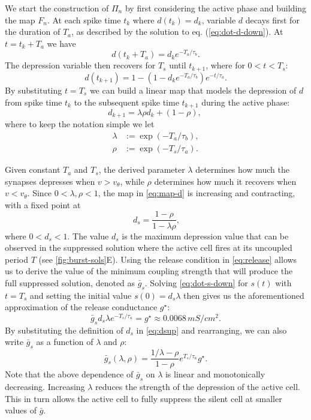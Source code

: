 We start the construction of $\Pi_n$ by first considering the active phase and building the map $F_n$.
At each spike time $t_{k}$ where $d(t_k) = d_k$, variable $d$ decays first for the duration of $T_{a}$, as described by the solution to eq. (\ref{eq:dot-d-down}).  %
At $t = t_k + T_{a}$ we have
\begin{equation}
	d(t_k + T_{a}) = d_k e^{-T_{a}/\tau_b}.
\end{equation}
The depression variable then recovers for $T_{s}$ until $t_{k+1}$, where for $0<t<T_{s}$:
\begin{equation}
	d(t_{k+1}) = 1 - (1 - d_k e^{-T_{a}/\tau_b} )e^{-t/\tau_a}.
\end{equation}
By substituting $t=T_{s}$ we can build a linear map that models the depression of $d$ from spike time $t_{k}$ to the subsequent spike time $t_{k+1}$ during the active phase:
\begin{equation}
	d_{k+1} = \lambda\rho d_{k} + (1-\rho),~\label{eq:map-d}
\end{equation}
where to keep the notation simple we let
\begin{align}
	\lambda & := \exp(-T_{a}/\tau_b), \label{eq:lambda} \\
	\rho    & :=\exp(-T_{s}/\tau_{a}). \label{eq:rho}
\end{align}

Given constant $T_{a}$ and $T_{s}$, the derived parameter $\lambda$ determines how much the synapses depresses when $v>v_{\theta}$, while $\rho$ determines how much it recovers when $v<v_{\theta}$.
Since $0<\lambda, \rho<1$, the map in \cref{eq:map-d} is increasing and contracting, with a fixed point at
\begin{equation}
	~\label{eq:dsup}
	d_{s}=\frac{1-\rho}{1-\lambda\rho},
\end{equation}
where $0<d_{s}<1$.
The value $d_{s}$ is the maximum depression value that can be observed in the suppressed solution where the active cell fires at its uncoupled period $T$ (see \cref{fig:burst-sols}E).
Using the release condition in \cref{eq:release} allows us to derive the value of the minimum coupling strength that will produce the full suppressed solution, denoted as $\bar g_{s}$.
Solving \cref{eq:dot-s-down} for $s(t)$ with $t=T_{s}$ and setting the initial value $s(0)=d_s\lambda$ then gives us the aforementioned approximation of the release conductance $g^{\star}$:
\begin{equation}
	\label{eq:gstar}
	\bar g_s d_s\lambda e^{-T_{s}/\tau_\kappa}=g^{\star} \approx 0.0068\, \si{mS/cm^2}.
\end{equation}
By substituting the definition of $d_{s}$ in \eqref{eq:dsup} and rearranging, we can also write $\bar g_s$ as a function of $\lambda$ and $\rho$:
\begin{equation}
	\label{eq:gs}
	\bar g_s(\lambda, \rho) = \frac{1/\lambda-\rho}{1-\rho} e^{T_{s}/\tau_\kappa}g^\star.
\end{equation}
Note that the above dependence of $\bar g_{s}$ on $\lambda$ is linear and monotonically decreasing.
Increasing $\lambda$ reduces the strength of the depression of the active cell.
This in turn allows the active cell to fully suppress the silent cell at smaller values of $\bar g$.

